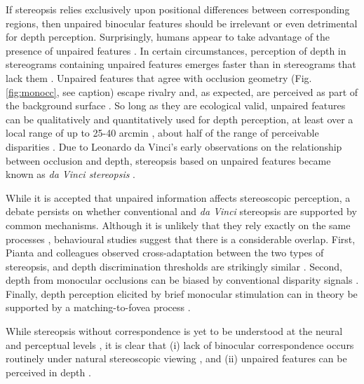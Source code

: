 If stereopsis relies exclusively upon positional differences between corresponding regions, then unpaired binocular features should be irrelevant or even detrimental for depth perception. Surprisingly, humans appear to take advantage of the presence of unpaired features \cite{Gillam:1988lo, Shimojo:1988fk, Nakayama:1990fc, Shimojo:1990uq}. In certain circumstances, perception of depth in stereograms containing unpaired features emerges faster than in stereograms that lack them \cite{Gillam:1988lo}. Unpaired features that agree with occlusion geometry (Fig. \ref{fig:monocc}, see caption) escape rivalry and, as expected, are perceived as part of the background surface \cite{Shimojo:1990uq}. So long as they are ecological valid, unpaired features can be qualitatively and quantitatively used for depth perception, at least over a local range of up to 25-40 arcmin \cite{Nakayama:1990fc}, about half of the range of perceivable disparities \cite{TYLER:1975fu}. Due to Leonardo da Vinci's early observations on the relationship between occlusion and depth, stereopsis based on unpaired features became known as \textit{da Vinci stereopsis} \cite{Nakayama:1990fc}. 

While it is accepted that unpaired information affects stereoscopic perception, a debate persists on whether conventional and \textit{da Vinci} stereopsis are supported by common mechanisms. Although it is unlikely that they rely exactly on the same processes \cite{Gillam:2003bh,Tsirlin:2012ys}, behavioural studies suggest that there is a considerable overlap. First, Pianta and colleagues observed cross-adaptation between the two types of stereopsis, and depth discrimination thresholds are strikingly similar \cite{Pianta:2003mz}. Second, depth from monocular occlusions can be biased by conventional disparity signals \cite{Tsirlin:2011bd}. Finally, depth perception elicited by brief monocular stimulation \cite{Kaye:1978os} can in theory be supported by a matching-to-fovea process \cite{Wilcox:2007zt}.

While stereopsis without correspondence is yet to be understood at the neural and perceptual levels \cite{Harris:2009qf}, it is clear that (i) lack of binocular correspondence occurs routinely under natural stereoscopic viewing \cite{Lawson:1967dq,Nakayama:1990fc,Anderson:1994fk,Anderson:1994qc}, and (ii) unpaired features can be perceived in depth \cite{Nakayama:1990fc, Shimojo:1990uq}. 


